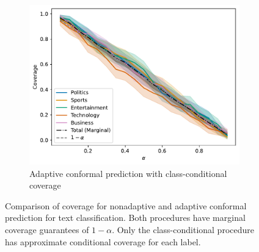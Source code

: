 \documentclass[a4paper, 12pt]{article}
\begin{document}
\begin{figure}[ht]
    \begin{subfigure}[b]{0.5\linewidth}
        \includegraphics[width=\linewidth]{figures/labelwise_conditional_coverage.pdf}
        \caption{Adaptive conformal prediction with class-conditional coverage}
        \label{fig:labelwise_coverage}
    \end{subfigure}
    \caption{Comparison of coverage for nonadaptive and adaptive conformal prediction for text classification. Both procedures have marginal coverage guarantees of $1-\alpha$. Only the class-conditional procedure has approximate conditional coverage for each label.}
    \label{fig:coverage}
\end{figure}
\end{document}
